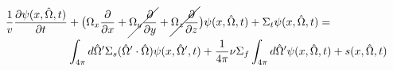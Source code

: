 \documentclass[12pt]{article}
\newlength{\up}
\newcommand{\vOmega}{\ensuremath{\hat{\Omega}}}
\begin{document}
\begin{align}
\frac{1}{v}\frac{\partial \psi(x, \vOmega, t)}{\partial t} &+ 
\bigl(\Omega_x \frac{\partial}{\partial x} + \cancel{\Omega_y \frac{\partial}{\partial y}} + \cancel{\Omega_z \frac{\partial}{\partial z}} \bigr)\psi(x, \vOmega, t) +
\Sigma_t \psi(x, \vOmega, t) = \nonumber\\
%
& \int_{4\pi} d\vOmega' \Sigma_s(\vOmega' \cdot \vOmega) \psi(x, \vOmega', t)  + 
\frac{1}{4\pi} \nu \Sigma_f \int_{4\pi} d\vOmega' \psi(x,  \vOmega, t) + s(x, \vOmega, t)%
\end{align}


%
%
%
%
%
%
%
\end{document}
